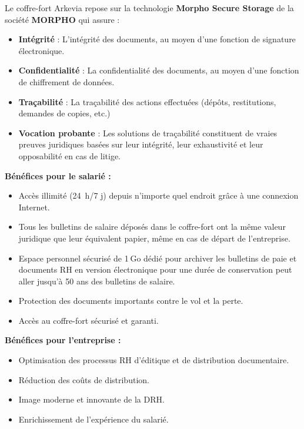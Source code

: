 Le coffre-fort Arkevia repose sur la technologie \textbf{Morpho Secure Storage} de la société \textbf{MORPHO} qui assure :
\begin{itemize}
    \item \textbf{Intégrité} : L'intégrité des documents, au moyen d’une fonction de signature électronique.
    \item \textbf{Confidentialité} : La confidentialité des documents, au moyen d’une fonction de chiffrement de données.
    \item \textbf{Traçabilité} : La traçabilité des actions effectuées (dépôts, restitutions, demandes de copies, etc.)
    \item \textbf{Vocation probante} : Les solutions de traçabilité constituent de vraies preuves juridiques basées sur leur intégrité, leur exhaustivité et leur opposabilité en cas de litige.\\
\end{itemize}
\newpage
\noindent
\textbf{Bénéfices pour le salarié :}
\begin{itemize}
    \item Accès illimité (24 h/7 j) depuis n’importe quel endroit grâce à une connexion Internet.
    \item Tous les bulletins de salaire déposés dans le coffre-fort ont la même valeur juridique que leur équivalent papier, même en cas de départ de l’entreprise.
    \item Espace personnel sécurisé de 1 Go dédié pour archiver les bulletins de paie et documents RH en version électronique pour une durée de conservation peut aller jusqu'à 50 ans des bulletins de salaire.
    \item Protection des documents importants contre le vol et la perte.
    \item Accès au coffre-fort sécurisé et garanti.\\
\end{itemize}

\noindent
\textbf{Bénéfices pour l’entreprise :}
\begin{itemize}
    \item Optimisation des processus RH d’éditique et de distribution documentaire.
    \item Réduction des coûts de distribution.
    \item Image moderne et innovante de la DRH.
    \item Enrichissement de l’expérience du salarié.
\end{itemize}
